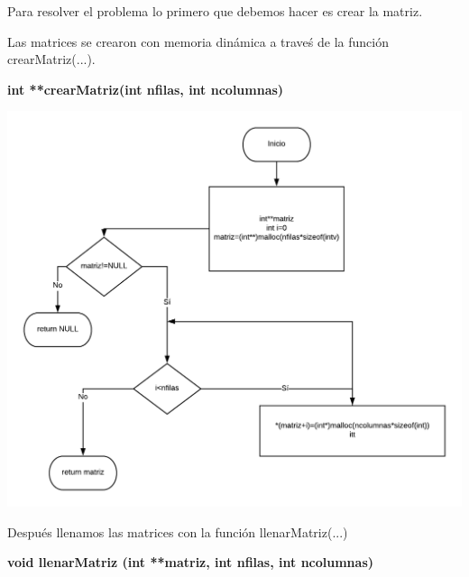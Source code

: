 \documentclass[10pt,a4paper]{article}
\begin{document}
\begin{flushleft}
Para resolver el problema lo primero que debemos hacer es crear la matriz.
\end{flushleft}

\begin{flushleft}
Las matrices se crearon con memoria dinámica a traveś de la función crearMatriz(...).
\end{flushleft}

\begin{flushleft}
\textbf{int **crearMatriz(int nfilas, int ncolumnas)}
\end{flushleft}

\begin{center}
	\includegraphics[scale=0.7]{crearMatriz.png} 
\end{center}

\begin{flushleft}
Después llenamos las matrices con la función llenarMatriz(...)
\end{flushleft}

\begin{flushleft}
\textbf{void llenarMatriz (int **matriz, int nfilas, int ncolumnas)}
\end{flushleft}
\end{document}
